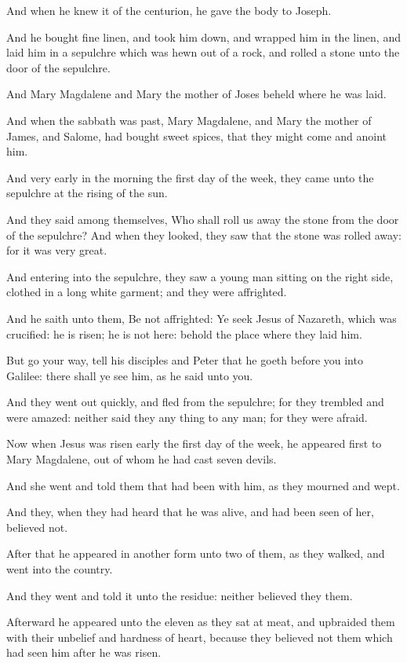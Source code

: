 \Verse And when he knew it of the centurion, he gave the body to Joseph.

\Verse And he bought fine linen, and took him down, and wrapped him in the linen, and laid him in a sepulchre which was hewn out of a rock, and rolled a stone unto the door of the sepulchre.

\Verse And Mary Magdalene and Mary the mother of Joses beheld where he was laid.


\Chapter
\Verse And when the sabbath was past, Mary Magdalene, and Mary the mother of James, and Salome, had bought sweet spices, that they might come and anoint him.

\Verse And very early in the morning the first day of the week, they came unto the sepulchre at the rising of the sun.

\Verse And they said among themselves, Who shall roll us away the stone from the door of the sepulchre?  \Verse And when they looked, they saw that the stone was rolled away: for it was very great.

\Verse And entering into the sepulchre, they saw a young man sitting on the right side, clothed in a long white garment; and they were affrighted.

\Verse And he saith unto them, Be not affrighted: Ye seek Jesus of Nazareth, which was crucified: he is risen; he is not here: behold the place where they laid him.

\Verse But go your way, tell his disciples and Peter that he goeth before you into Galilee: there shall ye see him, as he said unto you.

\Verse And they went out quickly, and fled from the sepulchre; for they trembled and were amazed: neither said they any thing to any man; for they were afraid.

\Verse Now when Jesus was risen early the first day of the week, he appeared first to Mary Magdalene, out of whom he had cast seven devils.

\Verse And she went and told them that had been with him, as they mourned and wept.

\Verse And they, when they had heard that he was alive, and had been seen of her, believed not.

\Verse After that he appeared in another form unto two of them, as they walked, and went into the country.

\Verse And they went and told it unto the residue: neither believed they them.

\Verse Afterward he appeared unto the eleven as they sat at meat, and upbraided them with their unbelief and hardness of heart, because they believed not them which had seen him after he was risen.

